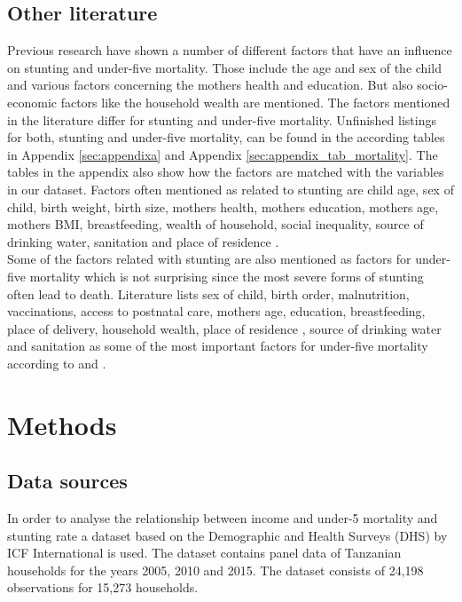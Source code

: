 \documentclass[a4paper, 11pt]{article} %
\begin{document}
\subsection*{Other literature}
Previous research have shown a number of different factors that have an influence on stunting and under-five mortality. Those include the age and sex of the child and various factors concerning the mothers health and education. But also socio-economic factors like the household wealth are mentioned. The factors mentioned in the literature differ for stunting and under-five mortality. Unfinished listings for both, stunting and under-five mortality, can be found in the according tables in Appendix \ref{sec:appendixa} and Appendix \ref{sec:appendix_tab_mortality}. The tables in the appendix also show how the factors are matched with the variables in our dataset. Factors often mentioned as related to stunting are child age, sex of child, birth weight, birth size, mothers health, mothers education, mothers age, mothers BMI, breastfeeding, wealth of household, social inequality, source of drinking water, sanitation and place of residence \cite{Akombi2017Aug}\cite{UNI18}. \\

Some of the factors related with stunting are also mentioned as factors for under-five mortality which is not surprising since the most severe forms of stunting often lead to death. Literature lists sex of child, birth order, malnutrition, vaccinations, access to postnatal care, mothers age, education, breastfeeding, place of delivery, household wealth, place of residence , source of drinking water and sanitation as some of the most important factors for under-five mortality according to \cite{Ettarh2012Mar}\cite{Who2020Sep} and \cite{UNICEF2006}. 


\section{Methods} \label{sec:methods}
\subsection*{Data sources}

In order to analyse the relationship between income and under-5 mortality and stunting rate a dataset based on the Demographic and Health Surveys (DHS) \cite{DHS20} by ICF International is used. The dataset contains panel data of Tanzanian households for the years 2005, 2010 and 2015. The dataset consists of 24,198 observations for 15,273 households.
\end{document}
